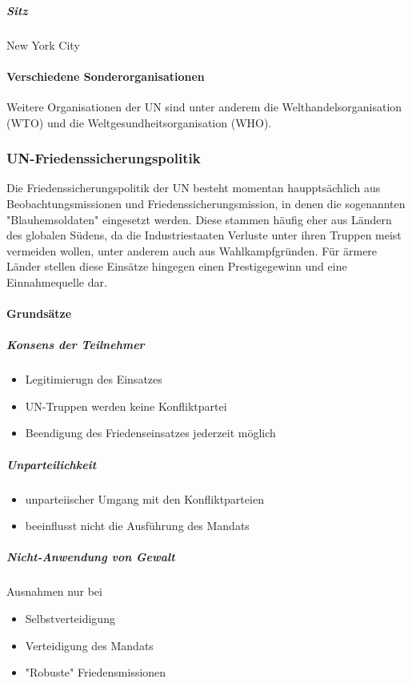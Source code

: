 \documentclass{article}
\begin{document}
	\subparagraph{Sitz}
	New York City

	\paragraph{Verschiedene Sonderorganisationen}
	Weitere Organisationen der UN sind unter anderem die Welthandelsorganisation (WTO) und die Weltgesundheitsorganisation (WHO).

	\subsubsection{UN-Friedenssicherungspolitik}
	Die Friedenssicherungspolitik der UN besteht momentan haupptsächlich aus Beobachtungsmissionen und Friedenssicherungsmission, in denen die sogenannten "Blauhemsoldaten" eingesetzt werden. Diese stammen häufig eher aus Ländern des globalen Südens, da die Industriestaaten Verluste unter ihren Truppen meist vermeiden wollen, unter anderem auch aus Wahlkampfgründen. Für ärmere Länder stellen diese Einsätze hingegen einen Prestigegewinn und eine Einnahmequelle dar.

	\paragraph{Grundsätze}

	\subparagraph{Konsens der Teilnehmer}
	\begin{itemize}
		\item Legitimierugn des Einsatzes
		\item UN-Truppen werden keine Konfliktpartei
		\item Beendigung des Friedenseinsatzes jederzeit möglich
	\end{itemize}
	
	\subparagraph{Unparteilichkeit}
	\begin{itemize}
		\item unparteiischer Umgang mit den Konfliktparteien
		\item beeinflusst nicht die Ausführung des Mandats
	\end{itemize}

	\subparagraph{Nicht-Anwendung von Gewalt}
	Ausnahmen nur bei
	
	\begin{itemize}
		\item Selbstverteidigung
		\item Verteidigung des Mandats
		\item "Robuste" Friedensmissionen
	\end{itemize}
\end{document}
